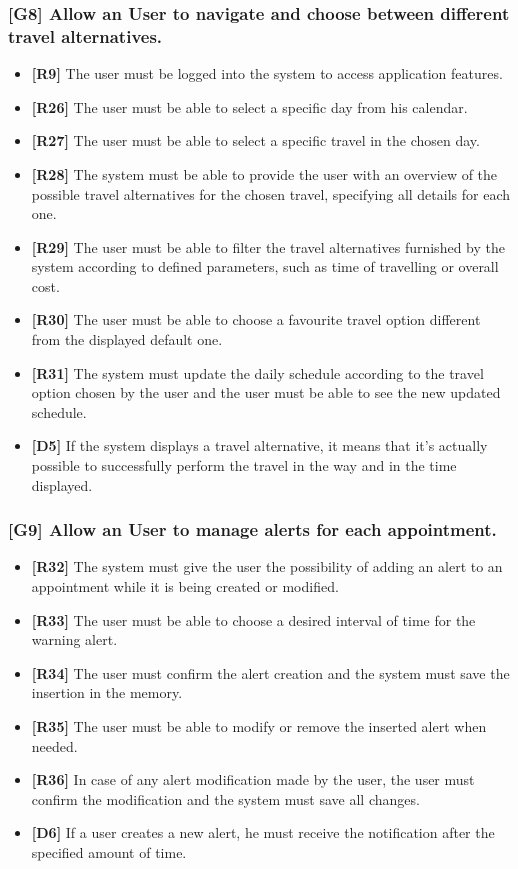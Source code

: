 \subsubsection{[G8] Allow an User to navigate and choose between different travel alternatives.}
\begin{itemize}
	\item \textbf{[R9]} The user must be logged into the system to access application features.
	\item \textbf{[R26]} The user must be able to select a specific day from his calendar.
	\item \textbf{[R27]} The user must be able to select a specific travel in the chosen day.
	\item \textbf{[R28]} The system must be able to provide the user with an overview of the possible travel alternatives for the chosen travel, specifying all details for each one.
	\item \textbf{[R29]} The user must be able to filter the travel alternatives furnished by the system according to defined parameters, such as time of travelling or overall cost.
	\item \textbf{[R30]} The user must be able to choose a favourite travel option different from the displayed default one.
	\item \textbf{[R31]} The system must update the daily schedule according to the travel option chosen by the user and the user must be able to see the new updated schedule.
	\item \textbf{[D5]} If the system displays a travel alternative, it means that it’s actually possible to successfully perform the travel in the way and in the time displayed.
	
\end{itemize}
\subsubsection{[G9] Allow an User to manage alerts for each appointment.}
\begin{itemize}
	\item \textbf{[R32]} The system must give the user the possibility of adding an alert to an appointment while it is being created or modified.
	\item \textbf{[R33]} The user must be able to choose a desired interval of time for the warning alert.
	\item \textbf{[R34]} The user must confirm the alert creation and the system must save the insertion in the memory.
	\item \textbf{[R35]} The user must be able to modify or remove the inserted alert when needed.
	\item \textbf{[R36]} In case of any alert modification made by the user, the user must confirm the modification and the system must save all changes.
	\item \textbf{[D6]} If a user creates a new alert, he must receive the notification after the specified amount of time.
	
\end{itemize}

